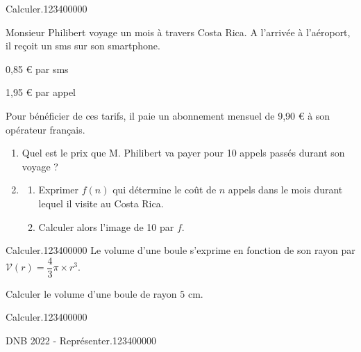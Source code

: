 \begin{pageParcoursd}
 
\begin{ExoCd}{Calculer.}{1234}{0}{0}{0}{0}{0}


Monsieur Philibert voyage un mois à travers Costa Rica. A l'arrivée à l'aéroport, il reçoit un sms sur son smartphone. 

\begin{center}
\begin{description}
\item  0,85 \euro{} par sms
\item  1,95 \euro{} par appel
\end{description}
\end{center}

Pour bénéficier de ces tarifs, il paie un abonnement mensuel de 9,90 \euro{} à son opérateur français.

\begin{enumerate}[leftmargin=*]
\item Quel est le prix que M. Philibert va payer pour 10 appels passés durant son voyage ? 
\item 
\begin{enumerate}
\item Exprimer $f(n)$ qui détermine le coût de $n$ appels dans le mois durant lequel il visite au Costa Rica. 
\item Calculer alors l'image de 10 par $f$. 
\end{enumerate}
\end{enumerate}

\end{ExoCd}

 \begin{ExoCd}{Calculer.}{1234}{0}{0}{0}{0}{0}
Le volume d'une boule s'exprime en fonction de son rayon par $\mathcal{V}(r) = \dfrac{4}{3} \pi\times r^3$. 

Calculer le volume d'une boule de rayon $5$ cm. 

\end{ExoCd}
 

\begin{ExoCd}{Calculer.}{1234}{0}{0}{0}{0}{0}
 
\end{ExoCd}
 
 
 
\begin{ExoCd}{DNB 2022 - Représenter.}{1234}{0}{0}{0}{0}{0}

\begin{minipage}{0.3\linewidth}


\end{minipage}
\end{ExoCd}
\end{pageParcoursd}
